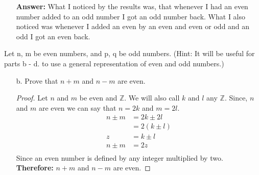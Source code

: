 \documentclass{article}
\begin{document}
\begin{itemize}
    \item[] \textbf{Answer:} What I noticed by the results was, that whenever I had an 
    even number added to an odd number I got an odd number back. What I also noticed was 
    whenever I added an even by an even and even or odd and an odd I got an even back. 
\end{itemize}
Let n, m be even numbers, and p, q be odd numbers. (Hint: It will be useful for
parts b - d. to use a general representation of even and odd numbers.)
\begin{itemize}
    \item[b.] Prove that $n + m$ and $n - m$ are even.
    \item[] 
    \begin{proof}
        Let $n$ and $m$ be even and $\mathbb{Z}$. We will also call $k$ and $l$ any $\mathbb{Z}$. 
        Since, $n$ and $m$ are even we can say that $n = 2k$ and $m = 2l$.
        \begin{align*}
            n \pm m &= 2k \pm 2l \\
            &= 2(k \pm l) \\
            z &= k \pm l \\
            n \pm m &= 2z \\
        \end{align*}
        Since an even number is defined by any integer multiplied by two.\newline
        \textbf{Therefore:} $n + m$ and $n - m$ are even.
       

\end{proof}
\end{itemize}
\end{document}

